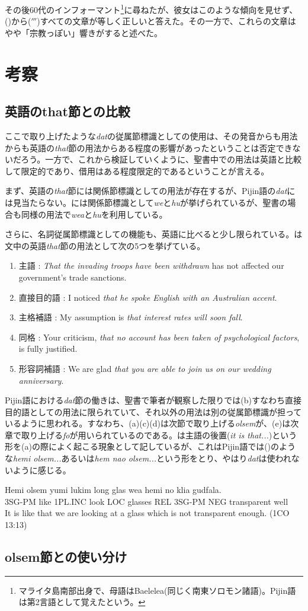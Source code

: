 その後60代のインフォーマント\footnote{マライタ島南部出身で、母語はBaelelea(同じく南東ソロモン諸語)。Pijin語は第2言語として覚えたという。}に尋ねたが、彼女はこのような傾向を見せず、()から($'''$)すべての文章が等しく正しいと答えた。その一方で、これらの文章はやや「宗教っぽい」響きがすると述べた。

\section{考察}
\subsection{英語のthat節との比較}

ここで取り上げたような\textit{dat}の従属節標識としての使用は、その発音からも用法からも英語の\textit{that}節の用法からある程度の影響があったということは否定できないだろう。一方で、これから検証していくように、聖書中での用法は英語と比較して限定的であり、借用はある程度限定的であるということが言える。

まず、英語の\textit{that}節には関係節標識としての用法が存在する\cite[365-367]{english}が、Pijin語の\textit{dat}には見当たらない。\cite{dictionary}には関係節標識として\textit{we}と\textit{hu}が挙げられているが、聖書の場合も同様の用法で\textit{wea}と\textit{hu}を利用している。

さらに、名詞従属節標識としての機能も、英語に比べると少し限られている。\cite{english}は文中の英語\textit{that}節の用法として次の5つを挙げている。

\begin{enumerate}
  \item 主語 : \textit{That the invading troops have been withdrawn} has not affected our government's trade sanctions.
  \item 直接目的語 : I noticed \textit{that he spoke English with an Australian accent}.
  \item 主格補語 : My assumption is \textit{that interest rates will soon fall}.
  \item 同格 : Your criticism, \textit{that no account has been taken of psychological factors}, is fully justified.
  \item 形容詞補語 : We are glad \textit{that you are able to join us on our wedding anniversary}.
\end{enumerate}

Pijin語における\textit{dat}節の働きは、聖書で筆者が観察した限りでは(b)すなわち直接目的語としての用法に限られていて、それ以外の用法は別の従属節標識が担っているように思われる。すなわち、(a)(c)(d)は次節で取り上げる\textit{olsem}が、(e)は次章で取り上げる\textit{fo}が用いられているのである。\cite{english}は主語の後置(\textit{it is that...})という形を(a)の際によく起こる現象として記しているが、これはPijin語では()のような\textit{hemi olsem...}あるいは\textit{hem nao olsem...}という形をとり、やはり\textit{dat}は使われないように感じる。

\begin{exe}
  \ex
  \gll Hemi olsem yumi lukim long glas wea hemi no klia gudfala.\\
  3SG-PM like 1PL.INC look LOC glasses REL 3SG-PM NEG transparent well\\
  \glt It is like that we are looking at a glass which is not transparent enough. (1CO 13:13)
\end{exe}

\subsection{olsem節との使い分け}
